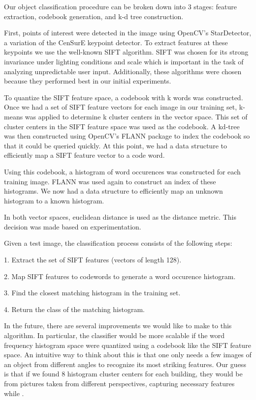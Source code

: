 Our object classification procedure can be broken down into 3 stages: feature
extraction, codebook generation, and k-d tree construction.

First, points of interest were detected in the image using OpenCV's StarDetector,
a variation of the CenSurE keypoint detector. To extract features at these
keypoints we use the well-known SIFT algorithm. SIFT was chosen for its strong
invariance under lighting conditions and scale which is important in the task of
analyzing unpredictable user input. Additionally, these algorithms were chosen
because they performed best in our initial experiments.

To quantize the SIFT feature space, a codebook with k words was constructed.
Once we had a set of SIFT feature vectors for each image in our training set,
k-means was applied to determine k cluster centers in the vector space. This set
of cluster centers in the SIFT feature space was used as the codebook. A kd-tree
was then constructed using OpenCV's FLANN package to index the codebook so that
it could be queried quickly. At this point, we had a data structure to
efficiently map a SIFT feature vector to a code word.

Using this codebook, a histogram of word occurences was constructed for each
training image. FLANN was used again to construct an
index of these histograms. We now had a data structure to efficiently map an
unknown histogram to a known histogram.

In both vector spaces, euclidean distance is used as the distance metric. This
decision was made based on experimentation.

Given a test image, the classification process consists of the following steps:

1. Extract the set of SIFT features (vectors of length 128).

2. Map SIFT features to codewords to generate a word occurence histogram.

3. Find the closest matching histogram in the training set.

4. Return the class of the matching histogram.

In the future, there are several improvements we would like to make to this
algorithm. In particular, the classifier would be more scalable if the word
frequency histogram space were quantized using a codebook like the SIFT feature
space. An intuitive way to think about this is that one only needs a few images
of an object from different angles to recognize its most striking features.
Our guess is that if we found 8 histogram cluster centers for each building,
they would be from pictures taken from different perspectives, capturing
necessary features while .



